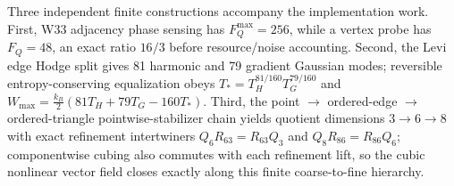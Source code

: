 Three independent finite constructions accompany the implementation work.  First, W33 adjacency phase sensing has $F_Q^{\max}=256$, while a vertex probe has $F_Q=48$, an exact ratio $16/3$ before resource/noise accounting.  Second, the Levi edge Hodge split gives 81 harmonic and 79 gradient Gaussian modes; reversible entropy-conserving equalization obeys $T_*=T_H^{81/160}T_G^{79/160}$ and $W_{\max}=\frac{k_B}{2}(81T_H+79T_G-160T_*)$.  Third, the point $\to$ ordered-edge $\to$ ordered-triangle pointwise-stabilizer chain yields quotient dimensions $3\to6\to8$ with exact refinement intertwiners $Q_6R_{63}=R_{63}Q_3$ and $Q_8R_{86}=R_{86}Q_6$; componentwise cubing also commutes with each refinement lift, so the cubic nonlinear vector field closes exactly along this finite coarse-to-fine hierarchy.
